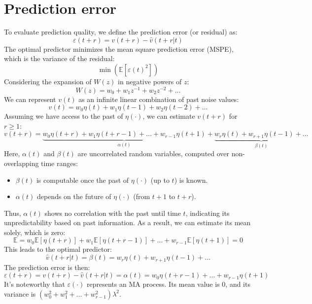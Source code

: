 \section{Prediction error}

To evaluate prediction quality, we define the prediction error (or residual) as:
\[\varepsilon(t+r)=v(t+r)-\hat{v}(t+r|t)\]
The optimal predictor minimizes the mean square prediction error (MSPE), which is the variance of the residual:
\[\min\left( \mathbb{E}\left[\varepsilon(t)^2 \right] \right)\]
Considering the expansion of $W(z)$ in negative powers of $z$:
\[W(z)=w_0+w_1z^{-1}+w_2z^{-2}+\dots\]
We can represent $v(t)$ as an infinite linear combination of past noise values:
\[v(t)=w_0\eta(t)+w_1\eta(t-1)+w_2\eta(t-2)+\dots\]
Assuming we have access to the past of $\eta(\cdot)$, we can estimate $v(t+r)$ for $r \geq 1$:
\[v(t+r)=\underbrace{w_0\eta(t+r)+w_1\eta(t+r-1)+\dots+w_{r-1}\eta(t+1)}_{\alpha(t)} +\underbrace{w_r\eta(t)+w_{r+1}\eta(t-1)+\dots}_{\beta(t)} \]
Here, $\alpha(t)$ and $\beta(t)$ are uncorrelated random variables, computed over non-overlapping time ranges:
\begin{itemize}
    \item $\beta(t)$ is computable once the past of $\eta(\cdot)$ (up to $t$) is known.
    \item $\alpha(t)$ depends on the future of $\eta(\cdot)$ (from $t+1$ to $t+r$).
\end{itemize}
Thus, $\alpha(t)$ shows no correlation with the past until time $t$, indicating its unpredictability based on past information.
As a result, we can estimate its mean solely, which is zero:
\[\mathbb{E}=w_0\mathbb{E}\left[\eta(t+r)\right]+w_1\mathbb{E}\left[\eta(t+r-1)\right]+\dots+w_{r-1}\mathbb{E}\left[\eta(t+1)\right]=0\]
This leads to the optimal predictor:
\[\hat{v}(t+r|t)=\beta(t)=w_r\eta(t)+w_{r+1}\eta(t-1)+\dots\]
The prediction error is then:
\[\varepsilon(t+r)=v(t+r)-\hat{v}(t+r|t)=\alpha(t)=w_0\eta(t+r-1)+\dots+w_{r-1}\eta(t+1)\]
It's noteworthy that $\varepsilon(\cdot)$ represents an MA process. 
Its mean value is 0, and its variance is $(w_0^2 + w_1^2 + \dots + w_{r-1}^2)\lambda^2$.

